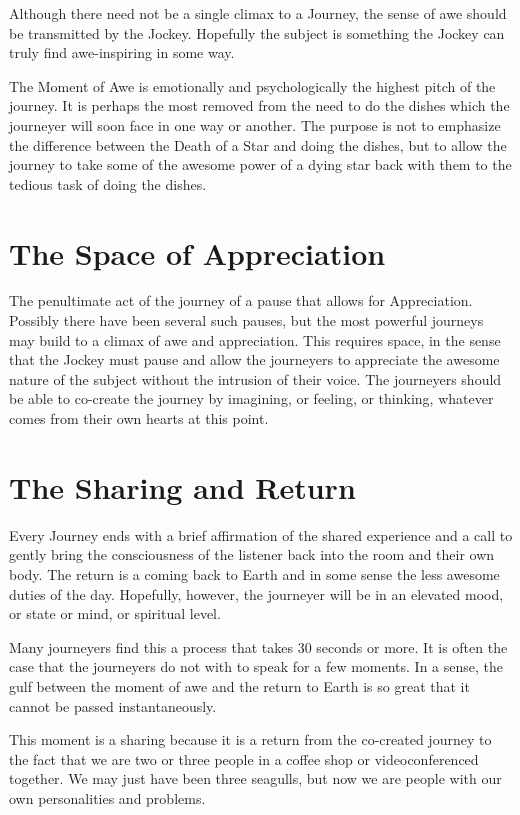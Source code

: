 \documentclass[12pt]{book}
\begin{document}
Although there need not be a single climax to a Journey,
the sense of awe should be transmitted by the Jockey.
Hopefully the subject is something the Jockey can
truly find awe-inspiring in some way.

The Moment of Awe is emotionally and psychologically
the highest pitch of the journey. It is perhaps the
most removed from the need to do the dishes which the
journeyer will soon face in one way or another. The purpose
is not to emphasize the difference between the Death of a
Star and doing the dishes, but to allow the journey to take
some of the awesome power of a dying star back with them
to the tedious task of doing the dishes.

\section{ The Space of Appreciation}

The penultimate act of the journey of a pause that
allows for Appreciation.  Possibly there have been several
such pauses, but the most powerful journeys may build to
a climax of awe and appreciation. This requires space,
in the sense that the Jockey must pause and allow the
journeyers to appreciate the awesome nature of the subject
without the intrusion of their voice.  The journeyers
should be able to co-create the journey by imagining,
or feeling, or thinking, whatever comes from their own
hearts at this point.


\section{ The Sharing and Return}

Every Journey ends with a brief affirmation of the
shared experience and a call to gently bring the consciousness
of the listener back into the room and their own body.
The return is a coming back to Earth and in some sense
the less awesome duties of the day. Hopefully, however, the
journeyer will be in an elevated mood, or state or mind,
or spiritual level.

Many journeyers find this a process that takes 30 seconds
or more. It is often the case that the journeyers do not
with to speak for a few moments. In a sense, the gulf
between the moment of awe and the return to Earth is
so great that it cannot be passed instantaneously.

This moment is a sharing because it is a return from the
co-created journey to the fact that we are two or three
people in a coffee shop or videoconferenced together.
We may just have been three seagulls, but now we are
people with our own personalities and problems.
\end{document}
